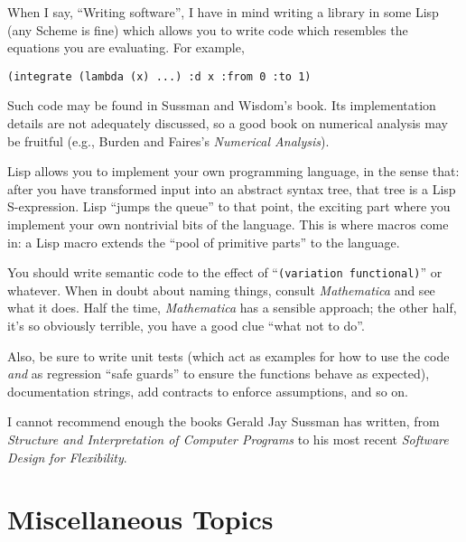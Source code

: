 \begin{remark}
When I say, ``Writing software'', I have in mind writing a library in
some Lisp (any Scheme is fine) which allows you to write code which
resembles the equations you are evaluating. For example,
\begin{Verbatim}
(integrate (lambda (x) ...) :d x :from 0 :to 1)
\end{Verbatim}
Such code may be found in Sussman and Wisdom's book. Its implementation
details are not adequately discussed, so a good book on numerical
analysis may be fruitful (e.g., Burden and Faires's \emph{Numerical Analysis}).

Lisp allows you to implement your own programming language, in the sense
that: after you have transformed input into an abstract syntax tree,
that tree is a Lisp S-expression. Lisp ``jumps the queue'' to that
point, the exciting part where you implement your own nontrivial bits of
the language. This is where macros come in: a Lisp macro extends the
``pool of primitive parts'' to the language.

You should write semantic code to the effect of ``\verb#(variation functional)#''
or whatever. When in doubt about naming things,
consult \emph{Mathematica} and see what it does. Half the
time, \emph{Mathematica} has a sensible approach; the other half, it's
so obviously terrible, you have a good clue ``what not to do''.

Also, be sure to write unit tests (which act as examples for how to use
the code \emph{and} as regression ``safe guards'' to ensure the
functions behave as expected), documentation strings, add contracts to
enforce assumptions, and so on.

I cannot recommend enough the books Gerald Jay Sussman has written,
from \emph{Structure and Interpretation of Computer Programs} to his
most recent \emph{Software Design for Flexibility}.
\end{remark}

\section{Miscellaneous Topics}

